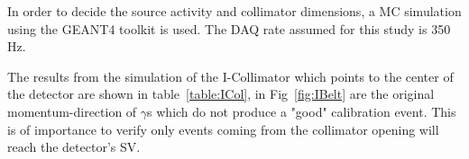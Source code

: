In order to decide the source activity and collimator dimensions, a MC simulation using the GEANT4 toolkit is used. The DAQ rate assumed for this study is 350\,Hz.

The results from the simulation of the I-Collimator which points to the center of the detector are shown in table~\ref{table:ICol}, in Fig~\ref{fig:IBelt} are the original momentum-direction of $\gamma$s which do not produce a "good" calibration event. This is of importance to verify only events coming from the collimator opening will reach the detector's SV.


\begin{table}
\begin{center}

\label{table:ICol}
\end{center}
\end{table}


